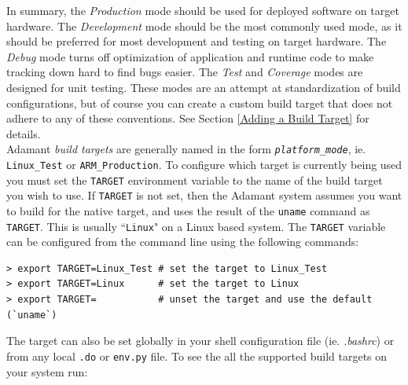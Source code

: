 In summary, the \textit{Production} mode should be used for deployed software on target hardware. The \textit{Development} mode should be the most commonly used mode, as it should be preferred for most development and testing on target hardware. The \textit{Debug} mode turns off optimization of application and runtime code to make tracking down hard to find bugs easier. The \textit{Test} and \textit{Coverage} modes are designed for unit testing. These modes are an attempt at standardization of build configurations, but of course you can create a custom build target that does not adhere to any of these conventions. See Section \ref{Adding a Build Target} for details. \\

Adamant \textit{build targets} are generally named in the form \texttt{\textit{platform}\_\textit{mode}}, ie. \texttt{Linux\_Test} or \texttt{ARM\_Production}. To configure which target is currently being used you must set the \texttt{TARGET} environment variable to the name of the build target you wish to use. If \texttt{TARGET} is not set, then the Adamant system assumes you want to build for the native target, and uses the result of the \texttt{uname} command as \texttt{TARGET}. This is usually ``\texttt{Linux}" on a Linux based system. The \texttt{TARGET} variable can be configured from the command line using the following commands:

\vspace{5mm} %
\begin{verbatim}
> export TARGET=Linux_Test # set the target to Linux_Test 
> export TARGET=Linux      # set the target to Linux 
> export TARGET=           # unset the target and use the default (`uname`)
\end{verbatim}
\vspace{5mm} %

The target can also be set globally in your shell configuration file (ie. \textit{.bashrc}) or from any local \texttt{.do} or \texttt{env.py} file. To see the all the supported build targets on your system run:

